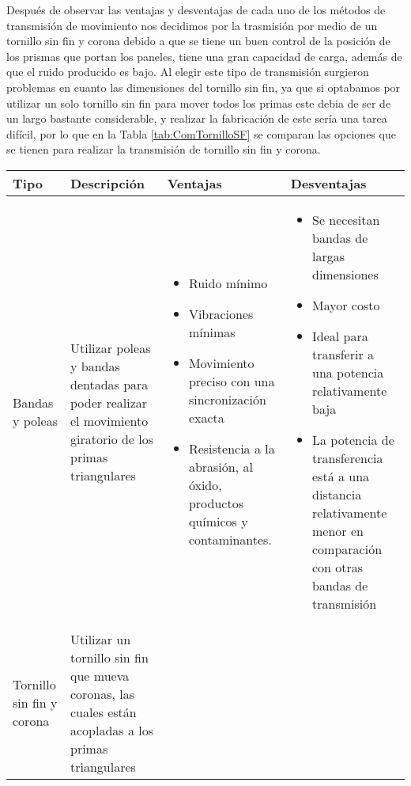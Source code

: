 Después de observar las ventajas y desventajas de cada uno de los métodos de transmisión de movimiento nos decidimos por la trasmisión por medio de un tornillo sin fin y corona debido a que se tiene un buen control de la posición de los prismas que portan los paneles, tiene una gran capacidad de carga, además de que el ruido producido es bajo. Al elegir este tipo de transmisión surgieron problemas en cuanto las dimensiones del tornillo sin fin, ya que si optabamos por utilizar un solo tornillo sin fin para mover todos los primas este debia de ser de un largo bastante considerable, y realizar la fabricación de este sería una tarea difícil, por lo que en la Tabla \ref{tab:ComTornilloSF} se comparan las opciones que se tienen para realizar la transmisión de tornillo sin fin y corona.
\begin{center}
\footnotesize
    \begin{longtable}[!htb]{| m{5em} | m{12em} | m{12em}| m{12em}|}
    \hline
    \textbf{Tipo}& \textbf{Descripción} & \textbf{Ventajas} & \textbf{Desventajas}\\
    \hline\hline
    Bandas y poleas& Utilizar poleas y bandas dentadas para poder realizar el movimiento giratorio de los primas triangulares &
    \begin{itemize}
        \item Ruido mínimo
        \item Vibraciones mínimas
        \item Movimiento preciso con una sincronización exacta
        \item Resistencia a la abrasión, al óxido, productos químicos y contaminantes.
    \end{itemize}
    & 
    \begin{itemize}
        \item Se necesitan bandas de largas dimensiones
        \item Mayor costo
        \item Ideal para transferir a una potencia relativamente baja
        \item La potencia de transferencia está a una distancia relativamente menor en comparación con otras bandas de transmisión
    \end{itemize}\\
    \hline
    Tornillo sin fin y corona & Utilizar un tornillo sin fin que mueva coronas, las cuales están acopladas a los primas triangulares &

\end{longtable}
\end{center}
